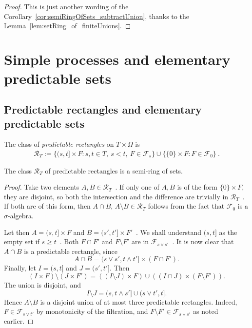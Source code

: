 \begin{proof}
This is just another wording of the Corollary~\ref{cor:semiRingOfSets_subtractUnion},
thanks to the Lemma~\ref{lem:setRing_of_finiteUnions}.
\end{proof}


\section{Simple processes and elementary predictable sets}

\subsection{Predictable rectangles and elementary predictable sets}

\begin{definition}\label{def:predictableRectangles}
  \leanok
The class of \emph{predictable rectangles} on $T \times \Omega$ is
\begin{align*}
  \mathcal{R}_T :=
  \big\{(s, t] \times F : s, t \in T,\ s < t,\ F \in \mathcal{F}_s\big\}
  \cup \big\{\{0\} \times F : F \in \mathcal{F}_0\big\}
  \: .
\end{align*}
\end{definition}

\begin{lemma}\label{lem:predictableRectangles_isSetSemiring}
  \leanok
The class $\mathcal{R}_T$ of predictable rectangles
 is a semi-ring of sets.
\end{lemma}

\begin{proof} \leanok
  Take two elements $A, B \in \mathcal{R}_T$~.
  If only one of $A, B$ is of the form $\{0\} \times F$,
  they are disjoint, so both the intersection and the difference
  are trivially in $\mathcal{R}_T$~.
  If both are of this form, then $A\cap B$, $A\setminus B\in\mathcal{R}_T$
  follows from the fact that $\mathcal{F}_0$ is a $\sigma$-algebra.

  Let then $A=(s, t] \times F$ and $B=(s', t'] \times F'$~.
  We shall understand $(s,t]$ as the empty set if $s \ge t$~.
  Both $F \cap F'$ and $F \setminus F'$ are in $\mathcal{F}_{s \vee s'}$~.
  It is now clear that $A\cap B$ is a predictable rectangle, since
  \[
  A \cap B
  =
  (s \vee s', t \wedge t'] \times (F \cap F').
  \]
  Finally, let $I=(s,t]$ and $J=(s',t']$. Then
  \[
    (I\times F)\setminus(J\times F')
    =
    ((I\setminus J)\times F)
    \cup
    ((I\cap J)\times(F\setminus F')).
  \]
  The union is disjoint, and
  \[
    I\setminus J
    =
    (s,t\wedge s']\cup(s\vee t',t].
  \]
  Hence $A\setminus B$ is a disjoint union of at most three predictable
  rectangles. Indeed, $F\in\mathcal{F}_{s\vee t'}$ by monotonicity of the
  filtration, and $F\setminus F'\in\mathcal{F}_{s\vee s'}$ as noted earlier.
\end{proof}

